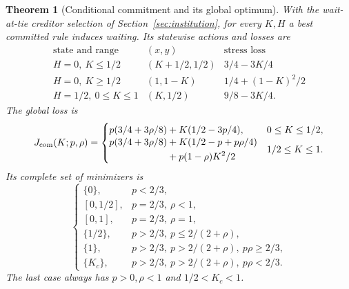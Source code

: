\documentclass[11pt,a4paper]{article}
\numberwithin{equation}{section}
\newtheorem{theorem}{Theorem}[section]
\theoremstyle{definition}
\begin{document}
\begin{theorem}[Conditional commitment and its global optimum]\label{thm:commitment}
With the wait-at-tie creditor selection of Section~\ref{sec:institution},
for every \(K,H\) a best committed rule induces waiting. Its statewise
actions and losses are
\begin{equation}\label{eq:commitstates}
\begin{array}{c|c|c}
\text{state and range}&(x,y)&\text{stress loss}\\ \hline
H=0,\ K\le1/2&(K+1/2,1/2)&3/4-3K/4\\
H=0,\ K\ge1/2&(1,1-K)&1/4+(1-K)^2/2\\
H=1/2,\ 0\le K\le1&(K,1/2)&9/8-3K/4 .
\end{array}
\end{equation}
The global loss is
\begin{equation}\label{eq:Jcommit}
J_{\rm com}(K;p,\rho)=
\begin{cases}
p(3/4+3\rho/8)+K(1/2-3p/4),&0\le K\le1/2,\\
\begin{aligned}
p(3/4+3\rho/8)&+K(1/2-p+p\rho/4)\\
              &+p(1-\rho)K^2/2
\end{aligned}&1/2\le K\le1 .
\end{cases}
\end{equation}
Its complete set of minimizers is
\begin{equation}\label{eq:commitclass}
\begin{cases}
\{0\},&p<2/3,\\
[0,1/2],&p=2/3,\ \rho<1,\\
[0,1],&p=2/3,\ \rho=1,\\
\{1/2\},&p>2/3,\ p\le2/(2+\rho),\\
\{1\},&p>2/3,\ p>2/(2+\rho),\ p\rho\ge2/3,\\
\{K_c\},&p>2/3,\ p>2/(2+\rho),\ p\rho<2/3 .
\end{cases}
\end{equation}
The last case always has \(p>0,\rho<1\) and \(1/2<K_c<1\).
\end{theorem}
\end{document}
